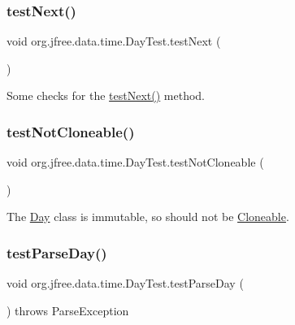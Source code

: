 \subsubsection{\texorpdfstring{test\+Next()}{testNext()}}
{\footnotesize\ttfamily void org.\+jfree.\+data.\+time.\+Day\+Test.\+test\+Next (\begin{DoxyParamCaption}{ }\end{DoxyParamCaption})}

Some checks for the \mbox{\hyperlink{classorg_1_1jfree_1_1data_1_1time_1_1_day_test_a0d8cbed22992cde61a2a5c72a944e115}{test\+Next()}} method. \mbox{\label{classorg_1_1jfree_1_1data_1_1time_1_1_day_test_a8c9d9735dc1132493daf582406b6e56d}} 
\subsubsection{\texorpdfstring{test\+Not\+Cloneable()}{testNotCloneable()}}
{\footnotesize\ttfamily void org.\+jfree.\+data.\+time.\+Day\+Test.\+test\+Not\+Cloneable (\begin{DoxyParamCaption}{ }\end{DoxyParamCaption})}

The \mbox{\hyperlink{classorg_1_1jfree_1_1data_1_1time_1_1_day}{Day}} class is immutable, so should not be \mbox{\hyperlink{}{Cloneable}}. \mbox{\label{classorg_1_1jfree_1_1data_1_1time_1_1_day_test_a03c13ce6817e379ab96a4fc82e312205}} 
\subsubsection{\texorpdfstring{test\+Parse\+Day()}{testParseDay()}}
{\footnotesize\ttfamily void org.\+jfree.\+data.\+time.\+Day\+Test.\+test\+Parse\+Day (\begin{DoxyParamCaption}{ }\end{DoxyParamCaption}) throws Parse\+Exception}

